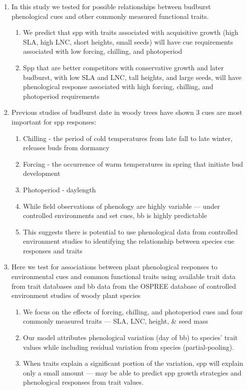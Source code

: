 \documentclass{article}
\begin{document}
\begin{enumerate}
\item In this study we tested for possible relationships between budburst phenological cues and other commonly measured functional traits.
\begin{enumerate}
\item We predict that spp with traits associated with acquisitive growth (high SLA, high LNC, short heights, small seeds) will have cue requirements associated with low forcing, chilling, and photoperiod
\item Spp that are better competitors with conservative growth and later budburst, with low SLA and LNC, tall heights, and large seeds, will have phenological response associated with high forcing, chilling, and photoperiod requirements
\end{enumerate}

\item Previous studies of budburst date in woody trees have shown 3 cues are most important for spp responses:
\begin{enumerate}
\item Chilling - the period of cold temperatures from late fall to late winter, releases buds from dormancy
\item Forcing - the occurrence of warm temperatures in spring that initiate bud development 
\item Photoperiod - daylength
\item While field observations of phenology are highly variable — under controlled environments and set cues, bb is highly predictable
\item This suggests there is potential to use phenological data from controlled environment studies to identifying the relationship between species cue responses and traits
\end{enumerate}

\item Here we test for associations between plant phenological responses to environmental cues and common functional traits using available trait data from trait databases and bb data from the OSPREE database of controlled environment studies of woody plant species 
\begin{enumerate}
\item We focus on the effects of forcing, chilling, and photoperiod cues and four commonly measured traits — SLA, LNC, height, \& seed mass
\item Our model attributes phenological variation (day of bb) to species’ trait values while including residual variation from species (partial-pooling).
\item When traits explain a significant portion of the variation, spp will explain only a small amount — may be able to predict spp growth strategies and phenological responses from trait values.
\end{enumerate}

\end{enumerate}
\end{document}
